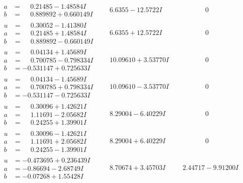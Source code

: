 \documentclass[1p]{elsarticle_modified}
\theoremstyle{definition}
\begin{document}
$$\begin{array}{c|c|c}
\begin{aligned}
a &= \phantom{-}0.21485 - 1.48584 I \\
b &= \phantom{-}0.889892 + 0.660149 I\end{aligned}
 & \phantom{-}6.6355 - 12.5722 I & \phantom{-0.000000 } 0 \\ \hline\begin{aligned}
u &= \phantom{-}0.30052 - 1.41380 I \\
a &= \phantom{-}0.21485 + 1.48584 I \\
b &= \phantom{-}0.889892 - 0.660149 I\end{aligned}
 & \phantom{-}6.6355 + 12.5722 I & \phantom{-0.000000 } 0 \\ \hline\begin{aligned}
u &= \phantom{-}0.04134 + 1.45689 I \\
a &= \phantom{-}0.700785 - 0.798334 I \\
b &= -0.531147 + 0.725633 I\end{aligned}
 & \phantom{-}10.09610 + 3.53770 I & \phantom{-0.000000 } 0 \\ \hline\begin{aligned}
u &= \phantom{-}0.04134 - 1.45689 I \\
a &= \phantom{-}0.700785 + 0.798334 I \\
b &= -0.531147 - 0.725633 I\end{aligned}
 & \phantom{-}10.09610 - 3.53770 I & \phantom{-0.000000 } 0 \\ \hline\begin{aligned}
u &= \phantom{-}0.30096 + 1.42621 I \\
a &= \phantom{-}1.11691 - 2.05682 I \\
b &= \phantom{-}0.24255 + 1.39901 I\end{aligned}
 & \phantom{-}8.29004 - 6.40229 I & \phantom{-0.000000 } 0 \\ \hline\begin{aligned}
u &= \phantom{-}0.30096 - 1.42621 I \\
a &= \phantom{-}1.11691 + 2.05682 I \\
b &= \phantom{-}0.24255 - 1.39901 I\end{aligned}
 & \phantom{-}8.29004 + 6.40229 I & \phantom{-0.000000 } 0 \\ \hline\begin{aligned}
u &= -0.473695 + 0.236439 I \\
a &= -0.86694 - 2.68749 I \\
b &= -0.07268 + 1.55428 I\end{aligned}
 & \phantom{-}8.70674 + 3.45703 I & \phantom{-}2.44717 - 9.91200 I \\ \hline\begin{aligned}

\end{aligned}
\end{array}$$
\end{document}
